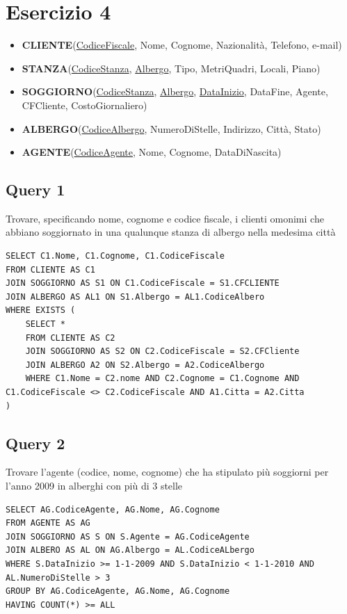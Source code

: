 \newpage
\section{Esercizio 4}
\begin{itemize}
    \item \textbf{CLIENTE}(\underline{CodiceFiscale}, Nome, Cognome, Nazionalità, Telefono, e-mail) 
    \item \textbf{STANZA}(\underline{CodiceStanza}, \underline{Albergo}, Tipo, MetriQuadri, Locali, Piano) 
    \item \textbf{SOGGIORNO}(\underline{CodiceStanza}, \underline{Albergo}, \underline{DataInizio}, DataFine, Agente, CFCliente, CostoGiornaliero) 
    \item \textbf{ALBERGO}(\underline{CodiceAlbergo}, NumeroDiStelle, Indirizzo, Città, Stato) 
    \item \textbf{AGENTE}(\underline{CodiceAgente}, Nome, Cognome, DataDiNascita)
\end{itemize}

\subsection{Query 1}
Trovare, specificando nome, cognome e codice fiscale, i clienti omonimi che abbiano soggiornato in una qualunque stanza di albergo nella medesima città

\begin{lstlisting}
SELECT C1.Nome, C1.Cognome, C1.CodiceFiscale
FROM CLIENTE AS C1
JOIN SOGGIORNO AS S1 ON C1.CodiceFiscale = S1.CFCLIENTE
JOIN ALBERGO AS AL1 ON S1.Albergo = AL1.CodiceAlbero
WHERE EXISTS (
    SELECT * 
    FROM CLIENTE AS C2
    JOIN SOGGIORNO AS S2 ON C2.CodiceFiscale = S2.CFCliente
    JOIN ALBERGO A2 ON S2.Albergo = A2.CodiceAlbergo
    WHERE C1.Nome = C2.nome AND C2.Cognome = C1.Cognome AND C1.CodiceFiscale <> C2.CodiceFiscale AND A1.Citta = A2.Citta
)
\end{lstlisting}

\subsection{Query 2}
Trovare l'agente (codice, nome, cognome) che ha stipulato più soggiorni per l'anno 2009 in alberghi con più di 3 stelle

\begin{lstlisting}
SELECT AG.CodiceAgente, AG.Nome, AG.Cognome
FROM AGENTE AS AG
JOIN SOGGIORNO AS S ON S.Agente = AG.CodiceAgente
JOIN ALBERO AS AL ON AG.Albergo = AL.CodiceALbergo
WHERE S.DataInizio >= 1-1-2009 AND S.DataInizio < 1-1-2010 AND AL.NumeroDiStelle > 3
GROUP BY AG.CodiceAgente, AG.Nome, AG.Cognome
HAVING COUNT(*) >= ALL
\end{lstlisting}

